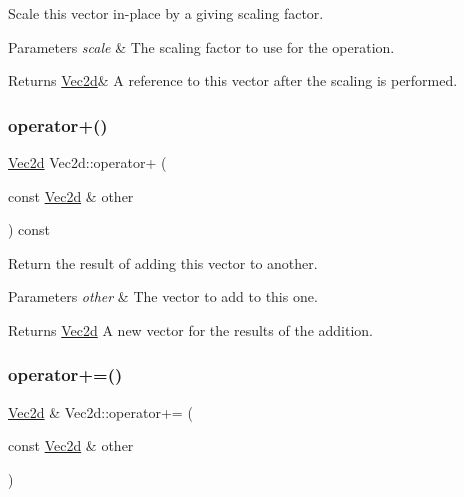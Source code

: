 Scale this vector in-\/place by a giving scaling factor. 


\begin{DoxyParams}{Parameters}
{\em scale} & The scaling factor to use for the operation. \\
\hline
\end{DoxyParams}
\begin{DoxyReturn}{Returns}
\hyperlink{classVec2d}{Vec2d}\& A reference to this vector after the scaling is performed. 
\end{DoxyReturn}
\mbox{\label{classVec2d_a77c0dc8f2313d12a31e0ef18175a6b82}} 
\subsubsection{\texorpdfstring{operator+()}{operator+()}}
{\footnotesize\ttfamily \hyperlink{classVec2d}{Vec2d} Vec2d\+::operator+ (\begin{DoxyParamCaption}\item[{const \hyperlink{classVec2d}{Vec2d} \&}]{other }\end{DoxyParamCaption}) const}



Return the result of adding this vector to another. 


\begin{DoxyParams}{Parameters}
{\em other} & The vector to add to this one. \\
\hline
\end{DoxyParams}
\begin{DoxyReturn}{Returns}
\hyperlink{classVec2d}{Vec2d} A new vector for the results of the addition. 
\end{DoxyReturn}
\mbox{\label{classVec2d_af1d5d15fbf2bb45dd189ad1d2202cc59}} 
\subsubsection{\texorpdfstring{operator+=()}{operator+=()}}
{\footnotesize\ttfamily \hyperlink{classVec2d}{Vec2d} \& Vec2d\+::operator+= (\begin{DoxyParamCaption}\item[{const \hyperlink{classVec2d}{Vec2d} \&}]{other }\end{DoxyParamCaption})}



